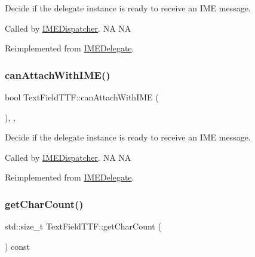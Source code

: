 Decide if the delegate instance is ready to receive an I\+ME message. 

Called by \hyperlink{classIMEDispatcher}{I\+M\+E\+Dispatcher}.  NA  NA 

Reimplemented from \hyperlink{classIMEDelegate_aa9e6c77460b633214759a779c16767f6}{I\+M\+E\+Delegate}.

\mbox{\label{classTextFieldTTF_a63d746d65aa355275274db754f49652b}} 
\subsubsection{\texorpdfstring{can\+Attach\+With\+I\+M\+E()}{canAttachWithIME()}\hspace{0.1cm}{\footnotesize\ttfamily [2/2]}}
{\footnotesize\ttfamily bool Text\+Field\+T\+T\+F\+::can\+Attach\+With\+I\+ME (\begin{DoxyParamCaption}{ }\end{DoxyParamCaption})\hspace{0.3cm}{\ttfamily [override]}, {\ttfamily [protected]}, {\ttfamily [virtual]}}



Decide if the delegate instance is ready to receive an I\+ME message. 

Called by \hyperlink{classIMEDispatcher}{I\+M\+E\+Dispatcher}.  NA  NA 

Reimplemented from \hyperlink{classIMEDelegate_aa9e6c77460b633214759a779c16767f6}{I\+M\+E\+Delegate}.

\mbox{\label{classTextFieldTTF_ac058c16dce279485b28c944583f924df}} 
\subsubsection{\texorpdfstring{get\+Char\+Count()}{getCharCount()}\hspace{0.1cm}{\footnotesize\ttfamily [1/2]}}
{\footnotesize\ttfamily std\+::size\+\_\+t Text\+Field\+T\+T\+F\+::get\+Char\+Count (\begin{DoxyParamCaption}{ }\end{DoxyParamCaption}) const\hspace{0.3cm}{\ttfamily [inline]}}

